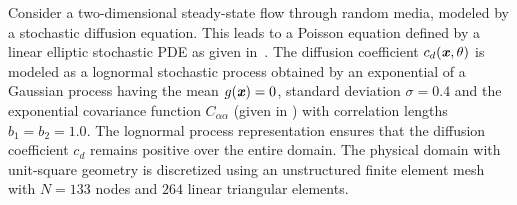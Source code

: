 \documentclass[letter,1p,11pt,oneside,onecolumn,sort&compress]{elsarticle}
\begin{document}
Consider a two-dimensional steady-state flow through random media, modeled by a stochastic diffusion equation. This leads to a Poisson equation defined by a linear elliptic stochastic PDE as given in~. %
The diffusion coefficient $c_d(\textbf{\textit{x}},\theta)$ is modeled as a lognormal stochastic process obtained by an exponential of a Gaussian process having the mean $g(\textbf{\textit{x}})=0$, standard deviation $\sigma=0.4$ and the exponential covariance function $C_{\alpha\alpha}$ (given in ) with correlation lengths $b_{1} = b_{2} = 1.0$. The lognormal process representation ensures that the diffusion coefficient $c_d$ remains positive over the entire domain.
The physical domain with unit-square geometry is discretized using an unstructured finite element mesh with $N=133$ nodes and $264$ linear triangular elements.
\end{document}
